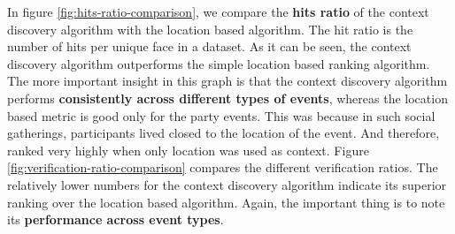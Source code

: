 In figure \ref{fig:hits-ratio-comparison}, we compare the \textbf{hits ratio} of the context discovery algorithm with the location based algorithm. The hit ratio is the number of hits per unique face in a dataset. As it can be seen, the context discovery algorithm outperforms the simple location based ranking algorithm. The more important insight in this graph is that the context discovery algorithm performs \textbf{consistently across different types of events}, whereas the location based metric is good only for the party events. This was because in such social gatherings, participants lived closed to the location of the event. And therefore, ranked very highly when only location was used as context. Figure \ref{fig:verification-ratio-comparison} compares the different verification ratios. The relatively lower numbers for the context discovery algorithm indicate its superior ranking over the location based algorithm. Again, the important thing is to note its \textbf{performance across event types}. 

